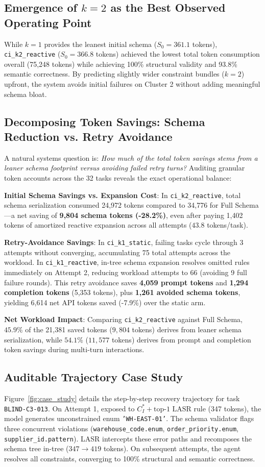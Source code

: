 \subsection{Emergence of $k=2$ as the Best Observed Operating Point}
While $k=1$ provides the leanest initial schema ($S_0 = 361.1$ tokens), \texttt{ci\_k2\_reactive} ($S_0 = 366.8$ tokens) achieved the lowest total token consumption overall (75,248 tokens) while achieving 100\% structural validity and 93.8\% semantic correctness. By predicting slightly wider constraint bundles ($k=2$) upfront, the system avoids initial failures on Cluster 2 without adding meaningful schema bloat.

\subsection{Decomposing Token Savings: Schema Reduction vs. Retry Avoidance}
A natural systems question is: \textit{How much of the total token savings stems from a leaner schema footprint versus avoiding failed retry turns?} Auditing granular token accounts across the 32 tasks reveals the exact operational balance:

\noindent\textbf{Initial Schema Savings vs. Expansion Cost}: In \texttt{ci\_k2\_reactive}, total schema serialization consumed 24,972 tokens compared to 34,776 for Full Schema—a net saving of \textbf{9,804 schema tokens (-28.2\%)}, even after paying 1,402 tokens of amortized reactive expansion across all attempts ($43.8$ tokens/task).

\noindent\textbf{Retry-Avoidance Savings}: In \texttt{ci\_k1\_static}, failing tasks cycle through 3 attempts without converging, accumulating 75 total attempts across the workload. In \texttt{ci\_k1\_reactive}, in-tree schema expansion resolves omitted rules immediately on Attempt 2, reducing workload attempts to 66 (avoiding 9 full failure rounds). This retry avoidance saves \textbf{4,059 prompt tokens} and \textbf{1,294 completion tokens} (5,353 tokens), plus \textbf{1,261 avoided schema tokens}, yielding 6,614 net API tokens saved (-7.9\%) over the static arm.

\noindent\textbf{Net Workload Impact}: Comparing \texttt{ci\_k2\_reactive} against Full Schema, $45.9\%$ of the 21,381 saved tokens ($9,804$ tokens) derives from leaner schema serialization, while $54.1\%$ ($11,577$ tokens) derives from prompt and completion token savings during multi-turn interactions.

\subsection{Auditable Trajectory Case Study}
Figure~\ref{fig:case_study} details the step-by-step recovery trajectory for task \texttt{BLIND-C3-013}. On Attempt 1, exposed to $C_I^* + \text{top-1 LASR rule}$ (347 tokens), the model generates unconstrained enum \texttt{'WH-EAST-01'}. The schema validator flags three concurrent violations (\texttt{warehouse\_code.enum}, \texttt{order\_priority.enum}, \texttt{supplier\_id.pattern}). LASR intercepts these error paths and recomposes the schema tree in-tree ($347 \rightarrow 419$ tokens). On subsequent attempts, the agent resolves all constraints, converging to 100\% structural and semantic correctness.

